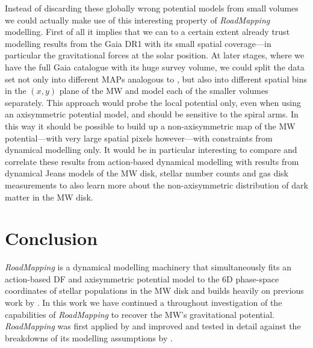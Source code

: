 \documentclass[iop,revtex4,numberedappendix,appendixfloats]{emulateapj}
\newcommand{\RM}{{\sl RoadMapping}}
\begin{document}
Instead of discarding these globally wrong potential models from small volumes we could actually make use of this interesting property of \RM{} modelling. First of all it implies that we can to a certain extent already trust modelling results from the Gaia DR1 with its small spatial coverage---in particular the gravitational forces at the solar position. At later stages, where we have the full Gaia catalogue with its huge survey volume, we could split the data set not only into different MAPs analogous to \citet{2013ApJ...779..115B}, but also into different spatial bins in the $(x,y)$ plane of the MW and model each of the smaller volumes separately. This approach would probe the local potential only, even when using an axisymmetric potential model, and should be sensitive to the spiral arms. In this way it should be possible to build up a non-axisymmetric map of the MW potential---with very large spatial pixels however---with constraints from dynamical modelling only. It would be in particular interesting to compare and correlate these results from action-based dynamical modelling with results from dynamical Jeans models of the MW disk, stellar number counts and gas disk measurements to also learn more about the non-axisymmetric distribution of dark matter in the MW disk.

\section{Conclusion} \label{sec:conclusion}

\RM{} is a dynamical modelling machinery that simultaneously fits an action-based DF and axisymmetric potential model to the 6D phase-space coordinates of stellar populations in the MW disk and builds heavily on previous work by \citet{2011MNRAS.413.1889B,2012MNRAS.426.1324B,2015ApJS..216...29B}. In this work we have continued a throughout investigation of the capabilities of \RM{} to recover the MW's gravitational potential. \RM{} was first applied by \citet{2013ApJ...779..115B} and improved and tested in detail against the breakdowns of its modelling assumptions by \citet{2016arXiv160508601T}.  
\end{document}
